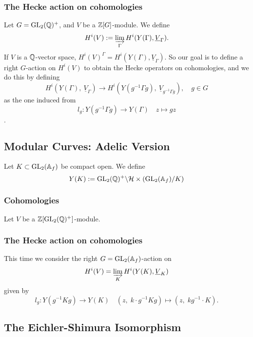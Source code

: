\subsubsection{The Hecke action on cohomologies}
Let $G = \GL_2(\Q)^+$, and $V$ be a $\Z[G]$-module.
We define \[H^i(V) := \varinjlim_{\Gamma}H^i(Y(\Gamma), \underline{V}_{\Gamma}).\]
If $V$ is a $\Q$-vector space, $H^i(V)^\Gamma = H^i(Y(\Gamma), \underline{V}_{\Gamma})$.
So our goal is to define a right $G$-action on $H^i(V)$ to obtain the Hecke operators on cohomologies,
and we do this by defining
\[H^i(Y(\Gamma),\ \underline{V}_{\Gamma})\to H^i(Y(g^{-1}\Gamma g),\ \underline{V}_{g^{-1}\Gamma g}),\quad g\in G\]
as the one induced from \[l_g  : Y(g^{-1}\Gamma g)\to Y(\Gamma)\quad z\mapsto gz\].




\subsection{Modular Curves: Adelic Version}
Let $K\subset\GL_2(\A_f)$ be compact open.
We define \[Y(K) := \bico{\mathcal{H}\times (\GL_2(\A_f)}{\GL_2(\Q)^+}{K)}\]
\subsubsection{Cohomologies}
Let $V$ be a $\Z[\GL_2(\Q)^+]$-module.


\subsubsection{The Hecke action on cohomologies}
This time we consider the right $G = \GL_2(\A_f)$-action on \[H^i(V) = \varinjlim_{K} H^i(Y(K), \underline{V}_K)\]
given by \[l_g : Y(g^{-1}K g)\to Y(K)\quad (z,\; k\cdot g^{-1}Kg)\mapsto (z,\; kg^{-1}\cdot K).\]


\subsection{The Eichler-Shimura Isomorphism}

